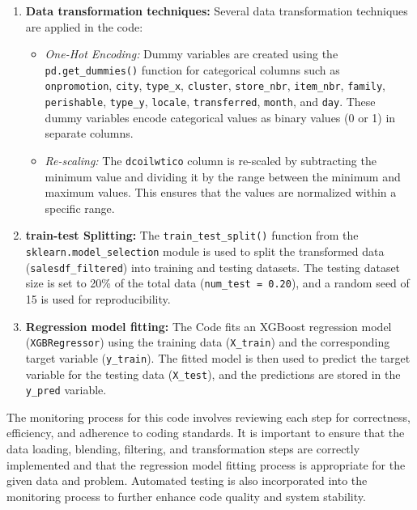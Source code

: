 \begin{enumerate}
	\item \textbf{Data transformation techniques:} Several data transformation techniques are applied in the code:
	\begin{itemize}
		\item \textit{One-Hot Encoding:} Dummy variables are created using the\\ \texttt{pd.get\_dummies()} function for categorical columns such as\\ \texttt{onpromotion}, \texttt{city}, \texttt{type\_x}, \texttt{cluster}, \texttt{store\_nbr}, \texttt{item\_nbr}, \texttt{family}, \texttt{perishable}, \texttt{type\_y}, \texttt{locale}, \texttt{transferred}, \texttt{month}, and \texttt{day}. These dummy variables encode categorical values as binary values (0 or 1) in separate columns.
		\item \textit{Re-scaling:} The \texttt{dcoilwtico} column is re-scaled by subtracting the minimum value and dividing it by the range between the minimum and maximum values. This ensures that the values are normalized within a specific range.
	\end{itemize}
	
	\item \textbf{train-test Splitting:} The \texttt{train\_test\_split()} function from the \\ \texttt{sklearn.model\_selection} module is used to split the transformed data (\texttt{salesdf\_filtered}) into training and testing datasets. The testing dataset size is set to 20\% of the total data (\texttt{num\_test = 0.20}), and a random seed of 15 is used for reproducibility.
	
	\item \textbf{Regression model fitting:} The Code fits an XGBoost regression model (\texttt{XGBRegressor}) using the training data (\texttt{X\_train}) and the corresponding target variable (\texttt{y\_train}). The fitted model is then used to predict the target variable for the testing data (\texttt{X\_test}), and the predictions are stored in the \texttt{y\_pred} variable.
\end{enumerate}




The monitoring process for this code involves reviewing each step for correctness, efficiency, and adherence to coding standards. It is important to ensure that the data loading, blending, filtering, and transformation steps are correctly implemented and that the regression model fitting process is appropriate for the given data and problem. Automated testing is also incorporated into the monitoring process to further enhance code quality and system stability.

